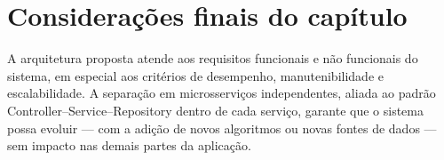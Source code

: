 \documentclass[
	12pt,				%
	openright,			%
	oneside,			    %
	a4paper,				%
	english,			%
	french,			%
	spanish,			%
	brazil			%
	]{abntex2}
\begin{document}
\section{Considerações finais do capítulo}

A arquitetura proposta atende aos requisitos funcionais e não funcionais do sistema, em especial aos critérios de desempenho, manutenibilidade e escalabilidade. A separação em microsserviços independentes, aliada ao padrão Controller--Service--Repository dentro de cada serviço, garante que o sistema possa evoluir — com a adição de novos algoritmos ou novas fontes de dados — sem impacto nas demais partes da aplicação.

\postextual


\end{document}
